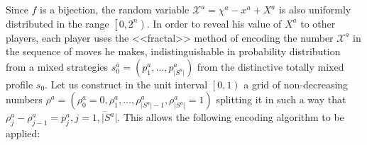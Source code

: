 Since $f$ is a bijection, the random variable $\mathcal{X}^a = \chi^a - x^a + X^a$ is also uniformly distributed in the range $\left[0, 2^n\right)$. In order to reveal his value of $X^a$ to other players, each player uses the <<fractal>> method of encoding the number $\mathcal{X}^a$ in the sequence of moves he makes, indistinguishable in probability distribution from a mixed strategies $s_0^a = (p^a_1, \ldots, p^a_{\lvert S^a \rvert})$ from the distinctive totally mixed profile $s_0$. Let us construct in the unit interval $\left[0, 1\right)$ a grid of non-decreasing numbers $\rho^a = (\rho^a_0 = 0, \rho^a_1, \ldots, \rho^a_{\lvert S^a \rvert - 1}, \rho^a_{\lvert S^a \rvert} = 1)$ splitting it in such a way that $\rho^a_j - \rho^a_{j-1} = p^a_j, j = \overline{1,\lvert S^a \rvert}$. This allows the following encoding algorithm to be applied: %

